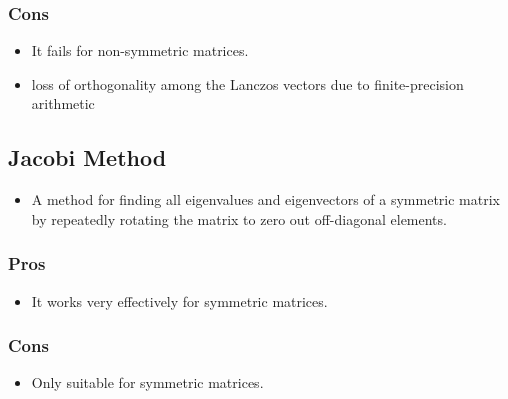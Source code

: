 \documentclass[journal]{IEEEtran}
\begin{document}
\subsubsection{Cons}
\begin{itemize}
    \item It fails for non-symmetric matrices.
    \item loss of orthogonality among the Lanczos vectors due to finite-precision arithmetic
\end{itemize}
\subsection{Jacobi Method}
\begin{itemize}
    \item  A method for finding all eigenvalues and eigenvectors of a symmetric matrix by repeatedly rotating the matrix to zero out off-diagonal elements.\\
\end{itemize}
\subsubsection{Pros}
\begin{itemize}
    \item It works very effectively for symmetric matrices.
\end{itemize}
\subsubsection{Cons}
\begin{itemize}
    \item Only suitable for symmetric matrices.
\end{itemize}
\begin{table}[h!]
\centering
{}
\label{tab:eigenvalue_methods}
\end{table}
\end{document}
